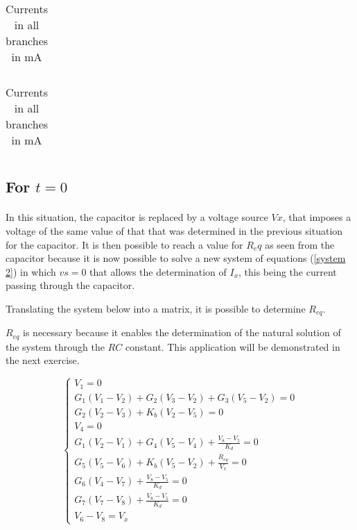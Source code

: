 \begin{table}[H]
    \begin{minipage}{.5\linewidth}
      \centering
        \begin{tabular}{|c|c|}
    	\hline
        	
        \end{tabular}
        \caption{Voltages in all nodes in V}
        \label{table1a}
    \end{minipage}%
    \begin{minipage}{.5\linewidth}
      \centering
        \begin{tabular}{|c|c|}
   	\hline
        	
        \end{tabular}
        \caption{Currents in all branches in mA}
        \label{table1b}
    \end{minipage} 
\end{table}
 

\subsection{For $t=0$}
\paragraph{}

\par In this situation, the capacitor is replaced by a voltage source $Vx$, that imposes a voltage of the same value of that that was determined in the previous situation for the capacitor. It is then possible to reach a value for $R_eq$ as seen from the capacitor because it is now possible to solve a new system of equations (\ref{system 2}) in which $vs=0$ that allows the determination of $I_x$, this being the current passing through the capacitor.
\par Translating the system below into a matrix, it is possible to determine $R_{eq}$.
\par $R_{eq}$ is necessary because it enables the determination of the natural solution of the system through the $RC$ constant. This application will be demonstrated in the next exercise.

$$
\begin{cases} 
	V_1 = 0 \\ 
	G_1 (V_1-V_2) + G_2 (V_3-V_2) + G_3 (V_5-V_2) = 0 \\
	G_2 (V_2-V_3) + K_b (V_2-V_5) = 0 \\
	V_4 = 0 \\
	G_1 (V_2-V_1) + G_4 (V_5-V_4) + \frac{V_8-V_5}{K_d} = 0 \\ 
	G_5 (V_5-V_6) + K_b (V_5-V_2) + \frac{R_{eq}}{V_x} = 0 \\
	G_6 (V_4-V_7) + \frac{V_8-V_5}{K_d} = 0 \\ 
	G_7 (V_7-V_8) + \frac{V_8-V_5}{K_d} = 0 \\
	V_6 - V_8 = V_x
\label{system 2}
\end{cases}
$$



